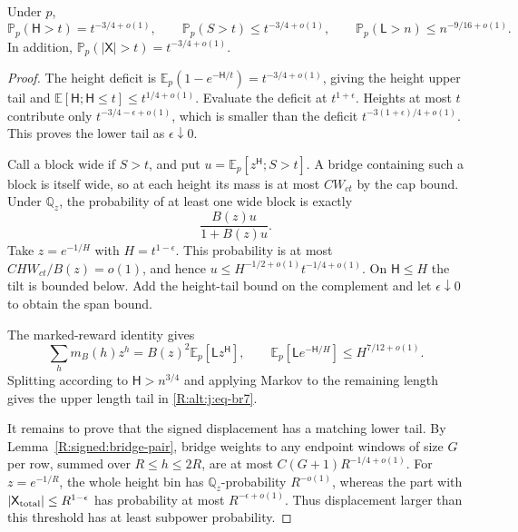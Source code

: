 \begin{lemma}
\label{R:signed:increments}
Under $p$,
\begin{equation}\label{R:alt:j:eq-br7}
 \mathbb P_p(\mathsf H>t)=t^{-3/4+o(1)},\qquad
 \mathbb P_p(S>t)\le t^{-3/4+o(1)},\qquad
 \mathbb P_p(\mathsf L>n)\le n^{-9/16+o(1)}.
\end{equation}
In addition, $\mathbb P_p(|\mathsf X|>t)=t^{-3/4+o(1)}$.
\end{lemma}
\begin{proof}
The height deficit is
$\mathbb E_p(1-e^{-\mathsf H/t})=t^{-3/4+o(1)}$, giving the height upper
tail and $\mathbb E[\mathsf H;\mathsf H\le t]\le t^{1/4+o(1)}$.
Evaluate the deficit at $t^{1+\epsilon}$. Heights at most $t$ contribute
only $t^{-3/4-\epsilon+o(1)}$, which is smaller than the deficit
$t^{-3(1+\epsilon)/4+o(1)}$. This proves the lower tail as
$\epsilon\downarrow0$.

Call a block wide if $S>t$, and put
$u=\mathbb E_p[z^{\mathsf H};S>t]$. A bridge containing such a block is
itself wide, so at each height its mass is at most $CW_{ct}$ by the cap
bound. Under $\mathbb Q_z$, the probability of at least one wide block
is exactly
\[
 \frac{B(z)u}{1+B(z)u}.
\]
Take $z=e^{-1/H}$ with $H=t^{1-\epsilon}$. This probability is at most
$CHW_{ct}/B(z)=o(1)$, and hence
$u\le H^{-1/2+o(1)}t^{-1/4+o(1)}$. On $\mathsf H\le H$ the tilt is
bounded below. Add the height-tail bound on the complement and let
$\epsilon\downarrow0$ to obtain the span bound.

The marked-reward identity gives
\[
 \sum_hm_B(h)z^h=B(z)^2\mathbb E_p[\mathsf Lz^{\mathsf H}],
 \qquad \mathbb E_p[\mathsf L e^{-\mathsf H/H}]
       \le H^{7/12+o(1)}.
\]
Splitting according to $\mathsf H>n^{3/4}$ and applying Markov to the
remaining length gives the upper length tail in
\eqref{R:alt:j:eq-br7}.

It remains to prove that the signed displacement has a matching lower
tail. By Lemma~\ref{R:signed:bridge-pair}, bridge weights to any endpoint
windows of size $G$ per row, summed over $R\le h\le2R$, are at most
$C(G+1)R^{-1/4+o(1)}$. For $z=e^{-1/R}$, the whole height bin has
$\mathbb Q_z$-probability $R^{-o(1)}$, whereas the part with
$|\mathsf X_{\rm total}|\le R^{1-\epsilon}$ has probability at most
$R^{-\epsilon+o(1)}$. Thus displacement larger than this threshold has
at least subpower probability.


\end{proof}
